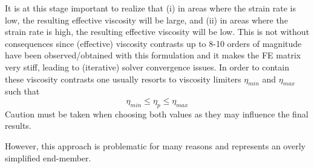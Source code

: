 It is at this stage important to realize that (i) in areas where the strain rate is low, the resulting effective viscosity will be large, and 
(ii) in areas where the strain rate is high, the resulting effective viscosity will be low. This is not without consequences since 
(effective) viscosity contrasts up to 8-10 orders of magnitude have been observed/obtained with this formulation and it makes the FE 
matrix very stiff, leading to (iterative) solver convergence issues.
In order to contain these viscosity contrasts one usually resorts to viscosity limiters $\eta_{min}$ and $\eta_{max}$ such that 
\[
\eta_{min} \leq \eta_p \leq \eta_{max}
\]
Caution must be taken when choosing both values as they may influence the final results.

However, this approach is problematic for many reasons and represents an overly simplified end-member. 




